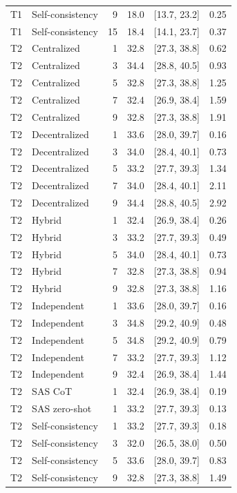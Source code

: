 \begin{tabular}{@{}llrrrr@{}}
T1 & Self-consistency & 9 & 18.0 & [13.7, 23.2] & 0.25 \\
T1 & Self-consistency & 15 & 18.4 & [14.1, 23.7] & 0.37 \\
T2 & Centralized & 1 & 32.8 & [27.3, 38.8] & 0.62 \\
T2 & Centralized & 3 & 34.4 & [28.8, 40.5] & 0.93 \\
T2 & Centralized & 5 & 32.8 & [27.3, 38.8] & 1.25 \\
T2 & Centralized & 7 & 32.4 & [26.9, 38.4] & 1.59 \\
T2 & Centralized & 9 & 32.8 & [27.3, 38.8] & 1.91 \\
T2 & Decentralized & 1 & 33.6 & [28.0, 39.7] & 0.16 \\
T2 & Decentralized & 3 & 34.0 & [28.4, 40.1] & 0.73 \\
T2 & Decentralized & 5 & 33.2 & [27.7, 39.3] & 1.34 \\
T2 & Decentralized & 7 & 34.0 & [28.4, 40.1] & 2.11 \\
T2 & Decentralized & 9 & 34.4 & [28.8, 40.5] & 2.92 \\
T2 & Hybrid & 1 & 32.4 & [26.9, 38.4] & 0.26 \\
T2 & Hybrid & 3 & 33.2 & [27.7, 39.3] & 0.49 \\
T2 & Hybrid & 5 & 34.0 & [28.4, 40.1] & 0.73 \\
T2 & Hybrid & 7 & 32.8 & [27.3, 38.8] & 0.94 \\
T2 & Hybrid & 9 & 32.8 & [27.3, 38.8] & 1.16 \\
T2 & Independent & 1 & 33.6 & [28.0, 39.7] & 0.16 \\
T2 & Independent & 3 & 34.8 & [29.2, 40.9] & 0.48 \\
T2 & Independent & 5 & 34.8 & [29.2, 40.9] & 0.79 \\
T2 & Independent & 7 & 33.2 & [27.7, 39.3] & 1.12 \\
T2 & Independent & 9 & 32.4 & [26.9, 38.4] & 1.44 \\
T2 & SAS CoT & 1 & 32.4 & [26.9, 38.4] & 0.19 \\
T2 & SAS zero-shot & 1 & 33.2 & [27.7, 39.3] & 0.13 \\
T2 & Self-consistency & 1 & 33.2 & [27.7, 39.3] & 0.18 \\
T2 & Self-consistency & 3 & 32.0 & [26.5, 38.0] & 0.50 \\
T2 & Self-consistency & 5 & 33.6 & [28.0, 39.7] & 0.83 \\
T2 & Self-consistency & 9 & 32.8 & [27.3, 38.8] & 1.49 \\

\end{tabular}
